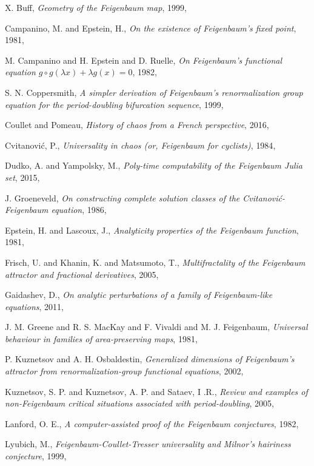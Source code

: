 \begin{description}
{X. Buff},
{\em Geometry of the {Feigenbaum} map},
{1999},

{Campanino, M. and Epstein, H.},
{\em On the existence of {Feigenbaum's} fixed point},
{1981},

{M. Campanino and H. Epstein and D. Ruelle},
{\em On {Feigenbaum}'s functional equation {$g \circ g(\lambda x) + \lambda g(x) = 0$}},
{1982},

{S. N. Coppersmith},
{\em A simpler derivation of {Feigenbaum}'s renormalization group equation for the period-doubling bifurcation sequence},
{1999},

{Coullet and Pomeau},
{\em History of chaos from a {French} perspective},
{2016},

{Cvitanovi{\'c}, P.},
{\em Universality in chaos (or, {Feigenbaum} for cyclists)},
{1984},

{Dudko, A. and Yampolsky, M.},
  {\em Poly-time computability of the {Feigenbaum Julia} set},
{2015},

{J. Groeneveld},
{\em On constructing complete solution classes of the {Cvitanovi{\'c}-Feigenbaum} equation},
{1986},

{Epstein, H. and Lascoux, J.},
{\em Analyticity properties of the {Feigenbaum} function},
{1981},

{Frisch, U. and Khanin, K. and Matsumoto, T.},
{\em Multifractality of the {Feigenbaum} attractor and fractional derivatives},
{2005},

{Gaidashev, D.},
{\em On analytic perturbations of a family of {Feigenbaum}-like equations},
 {2011},

{J. M. Greene and R. S. MacKay and F. Vivaldi and M. J. Feigenbaum},
{\em Universal behaviour in families of area-preserving maps},
{1981},

{P. Kuznetsov and A. H. Osbaldestin},
{\em Generalized dimensions of {Feigenbaum}'s attractor from renormalization-group functional equations},
{2002},

{Kuznetsov, S. P. and Kuznetsov, A. P. and Sataev, I .R.},
{\em Review and examples of non-{Feigenbaum} critical situations associated with period-doubling},
{2005},

{{Lanford}, O. E.},
{\em A computer-assisted proof of the {Feigenbaum} conjectures},
{1982},

{Lyubich, M.},
{\em {Feigenbaum-Coullet-Tresser} universality and {Milnor}'s hairiness conjecture},
{1999},


\end{description}
